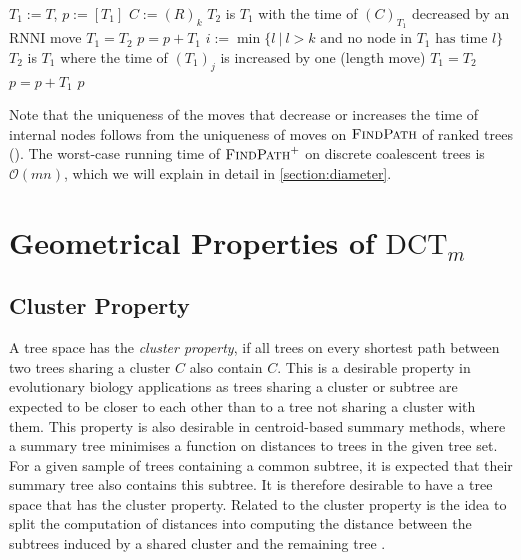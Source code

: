 \documentclass[11pt]{amsart}
\newcommand{\rnni}{\mathrm{RNNI}}
\newcommand{\findpath}{\textsc{FindPath}}
\newcommand{\ntime}{\mathrm{time}}
\newcommand{\dct}{\mathrm{DCT}}
\renewcommand{\O}{\mathcal O}
\newcommand{\summary}[1]{} %
\begin{document}
\begin{algorithm}[h]
	\caption{$\findpath^+$($T,R$)}
	\begin{algorithmic}[1]
		\label{alg:fp_dtt}
		\STATE $T_1 := T$, $p := [T_1]$
		 \label{alg:fp_dtt:for}
			\STATE $C:=(R)_k$
			\WHILE {$\ntime((C)_{T_1})>k$} \label{alg:fp_dtt:while}
					\STATE $T_2$ is $T_1$ with the time of $(C)_{T_1}$ decreased by an $\rnni$ move
				\STATE $T_1 = T_2$
				\STATE $p = p+T_1$
			\ENDWHILE
				\STATE $i := \min\{l \ |\  l>k \text{ and no node in } T_1 \text{ has time }l\}$ \label{line:min_free_time}
				 \label{alg:fp_dtt:nested_for}
					\label{line:length_move}
					\STATE $T_2$ is $T_1$ where the time of $(T_1)_j$ is increased by one (length move)
					\STATE $T_1 = T_2$
					\STATE $p = p+T_1$
				\ENDFOR
			\ENDIF
		\ENDFOR
		\RETURN $p$
	\end{algorithmic}
\end{algorithm}

Note that the uniqueness of the moves that decrease or increases the time of internal nodes follows from the uniqueness of moves on $\findpath$ of ranked trees (\autocite[Proposition 1]{Collienne2021}).
The worst-case running time of $\findpath^+$ on discrete coalescent trees is $\O(mn)$, which we will explain in detail in \autoref{section:diameter}.

\section{Geometrical Properties of $\dct_m$}
\label{section:geometry}

\subsection{Cluster Property}
\label{section:cluster_property}
\summary{Definition of Cluster Property and why it is relevant (a bit of bio).}
A tree space has the \emph{cluster property}, if all trees on every shortest path between two trees sharing a cluster $C$ also contain $C$.
This is a desirable property in evolutionary biology applications as trees sharing a cluster or subtree are expected to be closer to each other than to a tree not sharing a cluster with them.
This property is also desirable in centroid-based summary methods, where a summary tree minimises a function on distances to trees in the given tree set.
For a given sample of trees containing a common subtree, it is expected that their summary tree also contains this subtree.
It is therefore desirable to have a tree space that has the cluster property.
Related to the cluster property is the idea to split the computation of distances into computing the distance between the subtrees induced by a shared cluster and the remaining tree \autocite{Bordewich2005-nx}.
\end{document}

